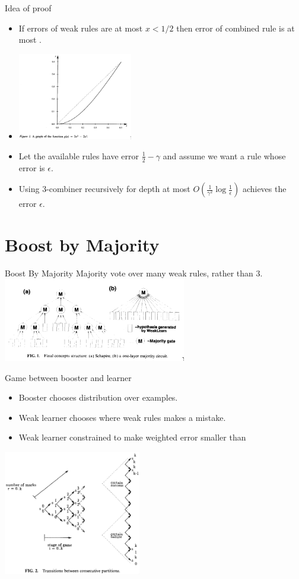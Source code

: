 \documentclass{beamer}
\begin{document}
\begin{frame}{Idea of proof}
  \begin{itemize}
  \item If errors of weak rules are at most $x<1/2$ then error of combined rule is at most .
  \item   \includegraphics[width=5cm]{figures/SchapireBoostg-graph.png}
  \item Let the available rules have error $\frac{1}{2}-\gamma$ and assume we want a rule whose error is $\epsilon$.
  \item Using 3-combiner recursively for depth at most $O(\frac{1}{\gamma^2} \log \frac{1}{\epsilon})$
  achieves the error $\epsilon$.
  \end{itemize}
  \end{frame}

\section{Boost by Majority}
\begin{frame}{Boost By Majority}
  Majority vote over many weak rules, rather than 3.
  ~\\
\includegraphics[width=8cm]{figures/BBMvsSchapire.png}
\end{frame}

\begin{frame}{Game between booster and learner}
  \begin{itemize}
  \item Booster chooses distribution over examples.
  \item Weak learner chooses where weak rules makes a mistake.
  \item Weak learner constrained to make weighted error smaller than 
  \end{itemize}
\includegraphics[width=6cm]{figures/BBMFigure.png}
\end{frame}
\end{document}
